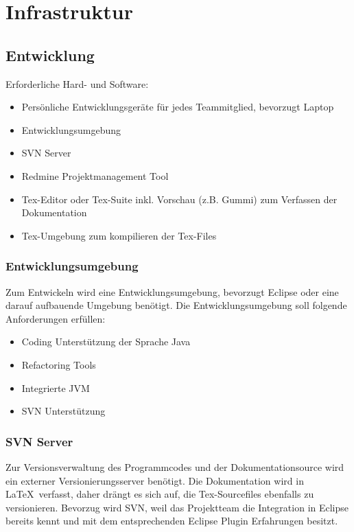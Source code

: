 \chapter{Infrastruktur}

\section{Entwicklung}
Erforderliche Hard- und Software:
\begin{itemize}
	\setlength{\itemsep}{-\parsep}
	\item Persönliche Entwicklungsgeräte für jedes Teammitglied, bevorzugt Laptop
	\item Entwicklungsumgebung
	\item \ac{SVN} Server
	\item Redmine Projektmanagement Tool
	\item Tex-Editor oder Tex-Suite inkl. Vorschau (z.B. Gummi) zum Verfassen der Dokumentation
	\item Tex-Umgebung zum kompilieren der Tex-Files
\end{itemize}

\subsection{Entwicklungsumgebung}
Zum Entwickeln wird eine Entwicklungsumgebung, bevorzugt Eclipse oder eine darauf aufbauende Umgebung benötigt. Die Entwicklungsumgebung soll folgende Anforderungen erfüllen:
\begin{itemize}
	\setlength{\itemsep}{-\parsep}
	\item Coding Unterstützung der Sprache Java
	\item Refactoring Tools
	\item Integrierte \ac{JVM}
	\item SVN Unterstützung
\end{itemize}

\subsection{SVN Server}
Zur Versionsverwaltung des Programmcodes und der Dokumentationsource wird ein externer Versionierungsserver benötigt. Die Dokumentation wird in \LaTeX\ verfasst, daher drängt es sich auf, die Tex-Sourcefiles ebenfalls zu versionieren. Bevorzug wird \ac{SVN}, weil das Projektteam die Integration in Eclipse bereits kennt und mit dem entsprechenden Eclipse Plugin Erfahrungen besitzt.

